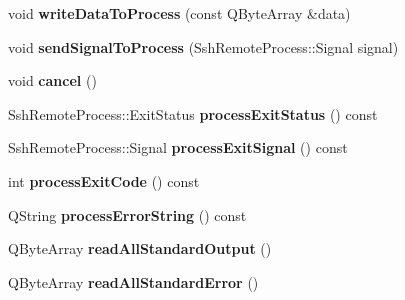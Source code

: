 \begin{DoxyCompactItemize}
\mbox{\label{class_q_ssh_1_1_ssh_remote_process_runner_ab5835baf8f64482c50e8314c9f107b4d}} 
void {\bfseries write\+Data\+To\+Process} (const Q\+Byte\+Array \&data)
\item 
\mbox{\label{class_q_ssh_1_1_ssh_remote_process_runner_af8f59ce1eb3d9a9952f4281889af4c1c}} 
void {\bfseries send\+Signal\+To\+Process} (Ssh\+Remote\+Process\+::\+Signal signal)
\item 
\mbox{\label{class_q_ssh_1_1_ssh_remote_process_runner_a9718fced525ab63e19768742d0db253d}} 
void {\bfseries cancel} ()
\item 
\mbox{\label{class_q_ssh_1_1_ssh_remote_process_runner_aea39f3323198483b6eeaef7378353243}} 
Ssh\+Remote\+Process\+::\+Exit\+Status {\bfseries process\+Exit\+Status} () const
\item 
\mbox{\label{class_q_ssh_1_1_ssh_remote_process_runner_a579449997797e493d54a731cd5aa1409}} 
Ssh\+Remote\+Process\+::\+Signal {\bfseries process\+Exit\+Signal} () const
\item 
\mbox{\label{class_q_ssh_1_1_ssh_remote_process_runner_ac88800a8734d8a19ba46a02e2422d014}} 
int {\bfseries process\+Exit\+Code} () const
\item 
\mbox{\label{class_q_ssh_1_1_ssh_remote_process_runner_ab54f9c9d9d05d8ca1b1b6b3729e9adc8}} 
Q\+String {\bfseries process\+Error\+String} () const
\item 
\mbox{\label{class_q_ssh_1_1_ssh_remote_process_runner_a6a15f53b29f708655c5902a5d6c570eb}} 
Q\+Byte\+Array {\bfseries read\+All\+Standard\+Output} ()
\item 
\mbox{\label{class_q_ssh_1_1_ssh_remote_process_runner_aeba12b63af00ae8b24ad82dc8d623502}} 
Q\+Byte\+Array {\bfseries read\+All\+Standard\+Error} ()
\end{DoxyCompactItemize}


